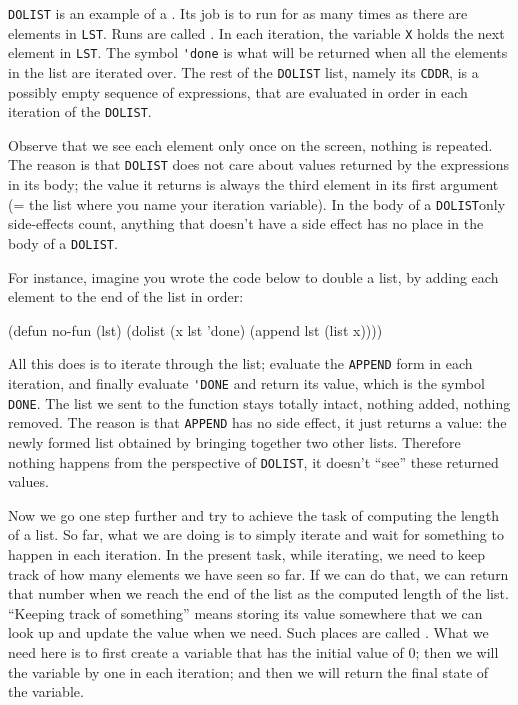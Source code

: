 \documentclass[a4paper,11pt]{article}
\begin{document}
\begin{uenum}
\item \Verb+DOLIST+ is an example of a . Its job is to run for as many times as there are elements in \Verb+LST+. Runs are called . In each iteration, the variable \Verb+X+ holds the next element in \Verb+LST+. The symbol \Verb+'done+ is what will be returned when all the elements in the list are iterated over. The rest of the \Verb+DOLIST+ list, namely its \Verb+CDDR+, is a possibly empty sequence of expressions, that are evaluated in order in each iteration of the \Verb+DOLIST+.

\begin{uenumi}
\item Observe that we see each element only once on the screen, nothing is repeated. The reason is that \Verb+DOLIST+ does not care about values returned by the expressions in its body; the value it returns is always the third element in its first argument (= the list where you name your iteration variable). In the body of a \Verb+DOLIST+only side-effects count, anything that doesn't have a side effect has no place in the body of a \Verb+DOLIST+.  

\item For instance, imagine you wrote the code below to double a list, by adding each element to the end of the list in order:  

\begin{lispcode}
(defun no-fun (lst)
  (dolist (x lst 'done)
	(append lst (list x))))
\end{lispcode}
\end{uenumi}

All this does is to iterate through the list; evaluate the \Verb+APPEND+ form in each iteration, and finally evaluate \Verb+'DONE+ and return its value, which is the symbol \Verb+DONE+. The list we sent to the function stays totally intact, nothing added, nothing removed. The reason is that \Verb+APPEND+ has no side effect, it just returns a value: the newly formed list obtained by bringing together two other lists. Therefore nothing happens from the perspective of \Verb+DOLIST+, it doesn't ``see'' these returned values.

\item Now we go one step further and try to achieve the task of computing the length of a list. So far, what we are doing is to simply iterate and wait for something to happen in each iteration. In the present task, while iterating, we need to keep track of how many elements we have seen so far. If we can do that, we can return that number when we reach the end of the list as the computed length of the list. ``Keeping track of something'' means storing its value somewhere that we can look up and update the value when we need. Such places are called . What we need here is to first create a variable that has the initial value of 0; then we will  the variable by one in each iteration; and then we will return the final state of the variable. 


\end{uenum}
\end{document}

